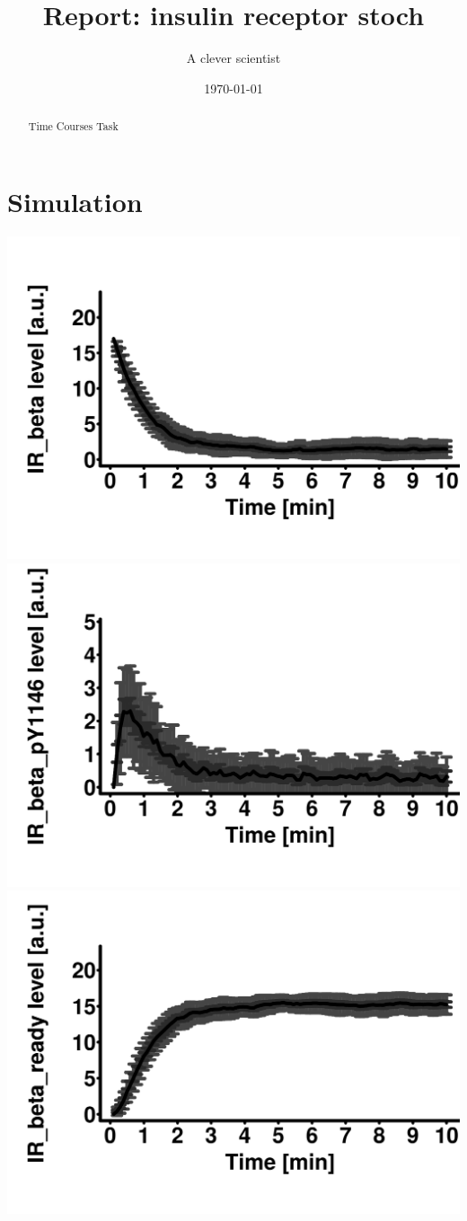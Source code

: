 \documentclass[10pt,a4paper]{article}
\author{A clever scientist}
\title{Report: insulin receptor stoch}
\date{\today}
\begin{document}
\maketitle
\begin{abstract}
Time Courses Task\end{abstract}
\tableofcontents
\section{Simulation}
\includegraphics[scale=0.08]{plots_stoch_tc_mean/insulin_receptor_stoch_sd_n_ci95_IR_beta.png}
\hfill
\includegraphics[scale=0.08]{plots_stoch_tc_mean/insulin_receptor_stoch_sd_n_ci95_IR_beta_pY1146.png}
\hfill
\includegraphics[scale=0.08]{plots_stoch_tc_mean/insulin_receptor_stoch_sd_n_ci95_IR_beta_ready.png}
\hfill
\end{document}
